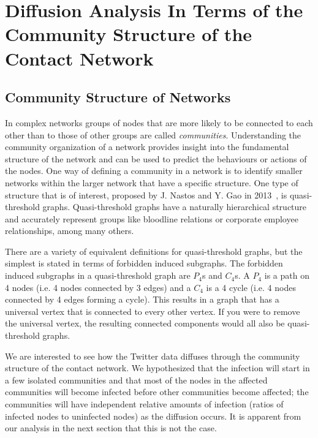 \documentclass[12pt, oneside, openany]{article} %
\begin{document}
\section{Diffusion Analysis In Terms of the Community Structure of the Contact Network}
\subsection{Community Structure of Networks}
In complex networks groups of nodes that are more likely to be connected to each other than to those of other groups are called \emph{communities}. Understanding the community organization of a network provides insight into the fundamental structure of the network and can be used to predict the behaviours or actions of the nodes. One way of defining a community in a network is to identify smaller networks within the larger network that have a specific structure. One type of structure that is of interest, proposed by J. Nastos and Y. Gao in 2013~\cite{nastos:2013}, is quasi-threshold graphs. Quasi-threshold graphs have a naturally hierarchical structure and accurately represent groups like bloodline relations or corporate employee relationships, among many others.

There are a variety of equivalent definitions for quasi-threshold graphs, but the simplest is stated in terms of forbidden induced subgraphs. The forbidden induced subgraphs in a quasi-threshold graph are $P_4$s and $C_4$s. A $P_4$ is a path on 4 nodes (i.e. 4 nodes connected by 3 edges) and a $C_4$ is a 4 cycle (i.e. 4 nodes connected by 4 edges forming a cycle). This results in a graph that has a universal vertex that is connected to every other vertex. If you were to remove the universal vertex, the resulting connected components would all also be quasi-threshold graphs.

We are interested to see how the Twitter data diffuses through the community structure of the contact network. We hypothesized that the infection will start in a few isolated communities and that most of the nodes in the affected communities will become infected before other communities become affected; the communities will have independent relative amounts of infection (ratios of infected nodes to uninfected nodes) as the diffusion occurs. It is apparent from our analysis in the next section that this is not the case.
\end{document}

